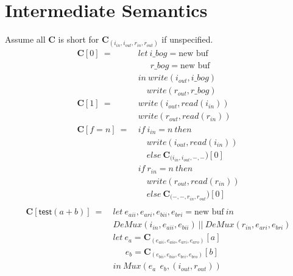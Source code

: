 \documentclass[12pt, letterpaper]{article}
\begin{document}
\section{Intermediate Semantics}
  Assume all $\mathbf{C}$ is short for $\mathbf{C}_{(i_{in},i_{out},r_{in},r_{out})}$ if unspecified.
  {\fontsize{12pt}{14pt}\selectfont
  \begin{align*}
    \mathbf{C}[0]\ 
      =\ &
      let\ i\_bog = \text{new buf}\\
      &\quad\ \ r\_bog = \text{new buf}\\
      &in\ write(i_{out}, i\_bog)\\
      &\quad  write(r_{out}, r\_bog)\\
    \mathbf{C}[1]\ 
      =\ &
      write(i_{out}, read(i_{in}))\\
      &write(r_{out}, read(r_{in}))
      \\
    \mathbf{C}[f = n]\
       =\
       &if\ i_{in}=n\ then\\
       &\quad write(i_{out}, read(i_{in}))\\
       &\quad else\ \mathbf{C}_{(i_{in}, i_{out}, -, -})[0]\\
       &if\ r_{in}=n\ then\\
       &\quad write(r_{out}, read(r_{in}))\\
       &\quad else\ \mathbf{C}_{(-, -, r_{in}, r_{out}})[0]\\
  \end{align*}
  \begin{align*}
    \mathbf{C}[\mathsf{test}(a + b)]\ 
      =\ &
      let\ e_{aii}, e_{ari}, e_{bii}, e_{bri} = \text{new buf}\ in\\
         &DeMux(i_{in}, e_{aii}, e_{bii})\ ||\ DeMux(r_{in}, e_{ari}, e_{bri})\\
      &let\ e_a = \mathbf{C}_{(e_{aii},e_{aio},e_{ari},e_{aro})}[a]\\
      &\quad\ \ e_b = \mathbf{C}_{(e_{bii},e_{bio},e_{bri},e_{bro})}[b]\\
      &in\ Mux(e_a\ \ e_b, (i_{out},r_{out}))\\

\end{align*}}
\end{document}
